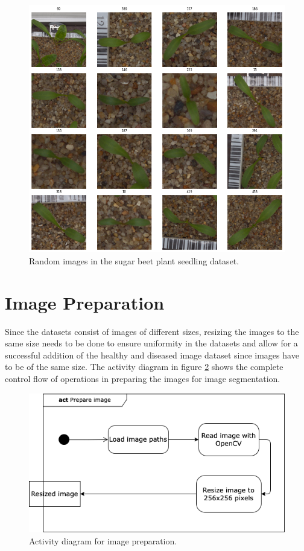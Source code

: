 \begin{figure}[!htb]
    \centering
    \includegraphics[scale=0.65, keepaspectratio]{Figures/notebook/sb-2.png}
    \caption{Random images in the sugar beet plant seedling dataset.}
    \label{fig:my_sb_2}
\end{figure}


\section{Image Preparation}
Since the datasets consist of images of different sizes, resizing the images to the same size needs to be done to ensure uniformity in the datasets and allow for a successful addition of the healthy and diseased image dataset since images have to be of the same size. The activity diagram in figure \ref{fig:my_act1} shows the complete control flow of operations in preparing the images for image segmentation.  


\begin{figure}[!htb]
    \centering
    \includegraphics[scale=0.75, keepaspectratio]{Figures/act1.png}
    \caption{Activity diagram for image preparation.}
    \label{fig:my_act1}
\end{figure}

